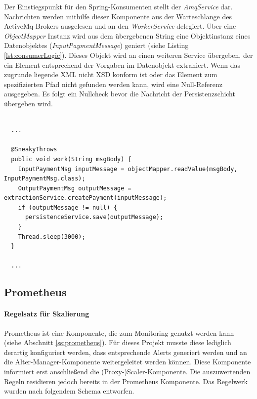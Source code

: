 Der Einstiegspunkt für den Spring-Konsumenten stellt der \emph{AmqService} dar. Nachrichten werden mithilfe dieser Komponente aus der Warteschlange des ActiveMq Brokers ausgelesen und an den \emph{WorkerService} delegiert. Über eine \emph{ObjectMapper} Instanz wird aus dem übergebenen String eine Objektinstanz eines Datenobjektes (\emph{InputPaymentMessage}) geniert (siehe Listing \ref{lst:consumerLogic}). Dieses Objekt wird an einen weiteren Service übergeben, der ein Element entsprechend der Vorgaben im Datenobjekt extrahiert. Wenn das zugrunde liegende XML nicht XSD konform ist oder das Element zum spezifizierten Pfad nicht gefunden werden kann, wird eine Null-Referenz ausgegeben. Es folgt ein Nullcheck bevor die Nachricht der Persistenzschicht übergeben wird.

\begin{minipage}{\linewidth}
\begin{lstlisting}[style=javaStyle,caption={WorkerService - Konsumer Logik},label=lst:consumerLogic]

  ...

  @SneakyThrows
  public void work(String msgBody) {
    InputPaymentMsg inputMessage = objectMapper.readValue(msgBody, InputPaymentMsg.class);
    OutputPaymentMsg outputMessage = extractionService.createPayment(inputMessage);
    if (outputMessage != null) {
      persistenceService.save(outputMessage);
    }
    Thread.sleep(3000);
  }

  ...

\end{lstlisting}
\end{minipage}

\subsection{Prometheus \checkmark}

\paragraph{Regelsatz für Skalierung \checkmark}
Prometheus ist eine Komponente, die zum Monitoring genutzt werden kann (siehe Abschnitt \ref{ss:prometheus}). Für dieses Projekt musste diese lediglich derartig konfiguriert werden, dass entsprechende Alerts generiert werden und an die Alter-Manager-Komponente weitergeleitet werden können. Diese Komponente informiert erst anschließend die (Proxy-)Scaler-Komponente. Die auszuwertenden Regeln residieren jedoch bereits in der Prometheus Komponente. Das Regelwerk wurden nach folgendem Schema entworfen.

